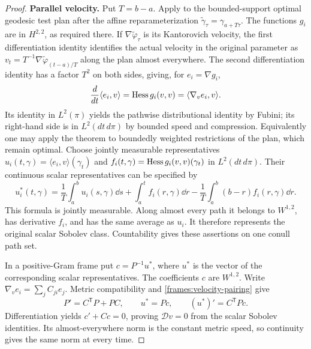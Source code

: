 \begin{proof}
 \textbf{Parallel velocity.}
 Put $T=b-a$.  Apply \cite[Theorem~5.13(i)]{GigliTamanini2021}
 to the bounded-support optimal geodesic test plan after the affine
 reparameterization $\widetilde\gamma_\tau=\gamma_{a+T\tau}$.
 The functions $g_i$ are in $H^{2,2}$, as required there.
 If $\nabla\widetilde\varphi_\tau$ is its Kantorovich velocity,
 the first differentiation identity identifies the actual velocity
 in the original parameter as
 $v_t=T^{-1}\nabla\widetilde\varphi_{(t-a)/T}$ along the plan
 almost everywhere.  The second differentiation identity has a
 factor $T^2$ on both sides, giving, for $e_i=\nabla g_i$,
 \begin{equation}\label{frames:velocity-pairing}
  \frac{d}{dt}\langle e_i,v\rangle
       =\operatorname{Hess} g_i(v,v)=\langle\nabla_v e_i,v\rangle.
 \end{equation}
 Its identity in $L^2(\pi)$ yields the pathwise distributional
 identity by Fubini; its right-hand side is in
 $L^2(dt\,d\pi)$ by bounded speed and compression.
 Equivalently one may apply the theorem to boundedly weighted
 restrictions of the plan, which remain optimal.
 Choose jointly measurable representatives
 $u_i(t,\gamma)=\langle e_i,v\rangle(\gamma_t)$ and
 $f_i(t,\gamma)=\operatorname{Hess} g_i(v,v)(\gamma_t)$ in $L^2(dt\,d\pi)$.
 Their continuous scalar representatives can be specified by
 \begin{equation}\label{frames:measurable-scalar-trace}
  u_i^*(t,\gamma)=\frac1T\int_a^b u_i(s,\gamma)\dd s
      +\int_a^t f_i(r,\gamma)\dd r
      -\frac1T\int_a^b(b-r)f_i(r,\gamma)\dd r.
 \end{equation}
 This formula is jointly measurable.  Along almost every path it
 belongs to $W^{1,2}$, has derivative $f_i$, and has the same
 average as $u_i$.  It therefore represents the original scalar
 Sobolev class.  Countability gives these assertions on one conull
 path set.

 In a positive-Gram frame put $c=P^{-1}u^*$, where $u^*$ is the
 vector of the corresponding scalar representatives.  The coefficients
 $c$ are $W^{1,2}$.  Write $\nabla_v e_i=\sum_j C_{ji}e_j$.
 Metric compatibility and \eqref{frames:velocity-pairing} give
 \[
  P'=C^{\mathsf T}P+PC,\qquad u^*=Pc,\qquad
  (u^*)'=C^{\mathsf T}Pc.
 \]
 Differentiation yields $c'+Cc=0$, proving $\mathcal Dv=0$
 from the scalar Sobolev identities.  Its almost-everywhere norm
 is the constant metric speed, so continuity gives the same norm
 at every time.


\end{proof}
